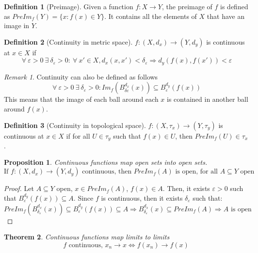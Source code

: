 \documentclass{article}
\newcommand{\Ar}{\Rightarrow}
\newcommand{\f}[3]{#1 : #2 \rightarrow #3}
\theoremstyle{definition}
\newtheorem{definition}{Definition}[section]
\theoremstyle{definition}
\theoremstyle{plain}
\newtheorem{theorem}{Theorem}[section]
\theoremstyle{plain}
\theoremstyle{plain}
\theoremstyle{plain}
\newtheorem{proposition}[theorem]{Proposition}
\theoremstyle{definition}
\theoremstyle{remark}
\theoremstyle{remark}
\theoremstyle{remark}
\theoremstyle{remark}
\newtheorem*{remark}{Remark}
\newcommand{\ForAll}{\ \forall \ }
\newcommand{\Exists}{\ \exists \ }
\newcommand{\E}{\varepsilon}
\begin{document}
\begin{definition}[Preimage]
  Given a function $\f{f}{X}{Y}$, the preimage of $f$ is defined as $PreIm_f(Y) = \{ x : f(x) \in Y \}$. It contains all the elements of $X$ that have an image in $Y$.
\end{definition}


\begin{definition}[Continuity in metric space]
  $\f{f}{(X,d_x)}{(Y,d_y)}$ is continuous at $x \in X$ if
  \[
    \ForAll \E > 0 \Exists \delta_\E > 0 : \ForAll x' \in X,
    d_x(x,x') < \delta_\E \Ar d_y(f(x),f(x')) < \E
  \]
\end{definition}


\begin{remark}
  Continuity can also be defined as follows
  \[
    \ForAll \E > 0 \Exists \delta_\E > 0 :
    Im_f(B_{\delta\E}^{d_x}(x)) \subseteq B_\E^{d_y}(f(x))
  \]
  This means that the image of each ball around each $x$ is contained in another ball around $f(x)$.
\end{remark}


\begin{definition}[Continuity in topological space]
  $\f{f}{(X,\tau_x)}{(Y,\tau_y)}$ is continuous at $x \in X$ if for all $U \in \tau_y$ such that $f(x) \in U$, then $PreIm_f(U) \in \tau_x$.
\end{definition}



\begin{proposition}
  Continuous functions map open sets into open sets.
  \[
  \text{If } \f{f}{(X,d_x)}{(Y,d_y)} \text{ continuous, then } PreIm_f(A) \text{ is open, for all } A \subseteq Y \text{ open}
  \]
\end{proposition}

\begin{proof}
  Let $A \subseteq Y$ open, $x \in PreIm_f(A)$, $f(x) \in A$. Then, it exists $\E > 0$ such that $B_\E^{d_y}(f(x)) \subseteq A$. Since $f$ is continuous, then it exists $\delta_\E$ such that:
  \[
    PreIm_f(B_{\delta_\E}^{d_x}(x)) \subseteq B_\E^{d_y}(f(x))
    \subseteq A \Ar B_{\delta_\E}^{d_x}(x) \subseteq PreIm_f(A)
    \Ar A \text{ is open}
  \]
\end{proof}


\begin{theorem}
  Continuous functions map limits to limits
  \[
    f \text{ continuous, } x_n \to x \iff f(x_n) \to f(x)
  \]
\end{theorem}
\end{document}
